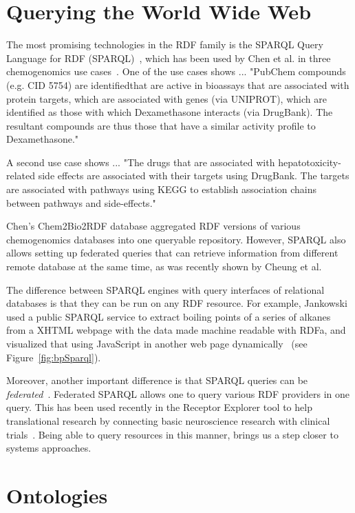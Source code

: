 \documentclass[10pt]{bmc_article}
\newenvironment{bmcformat}{\begin{raggedright}\baselineskip20pt\sloppy\setboolean{publ}{false}}{\end{raggedright}\baselineskip20pt\sloppy}
\begin{document}
\begin{bmcformat}
\section{Querying the World Wide Web}

The most promising technologies in the RDF family is the
SPARQL Query Language for RDF (SPARQL)~\cite{PrudHommeaux2008}, which has been
used by Chen et al. in three chemogenomics use cases~\cite{CHE2010}. 
One of the use cases shows ... "PubChem compounds (e.g. CID 5754) are identifiedthat are active in bioassays that are associated with protein targets, which are associated with genes (via UNIPROT), which are identified as those with which Dexamethasone interacts (via DrugBank). The resultant compounds are thus those that have a similar activity profile to Dexamethasone."

A second use case shows ... "The drugs that are associated with hepatotoxicity-related side effects are associated with their targets using DrugBank. The targets are associated with pathways using KEGG to establish association chains between pathways and side-effects."

Chen's Chem2Bio2RDF database aggregated RDF versions of various chemogenomics databases
into one queryable repository. However, SPARQL also allows setting up federated
queries that can retrieve information from different remote database at the same
time, as was recently shown by Cheung et al.~\cite{Cheung2009}

The difference between SPARQL engines with query interfaces of relational databases
is that they can be run on any RDF resource. For example, Jankowski used a public
SPARQL service to extract boiling points of a series of alkanes from a XHTML
webpage with the data made machine readable with RDFa, and visualized that using
JavaScript in another web page dynamically~\cite{Jankowski2010} (see
Figure~\ref{fig:bpSparql}).

Moreover, another important difference is that SPARQL queries can be
\textit{federated}~\cite{Prudhommeaux2007}.
Federated SPARQL allows one to query various RDF providers in one query. This has
been used recently in the Receptor Explorer tool to help translational research
by connecting basic neuroscience research with clinical trials~\cite{Cheung2009}.
Being able to query resources in this manner, brings us a step closer to
systems approaches.

\section{Ontologies}


\end{bmcformat}
\end{document}
